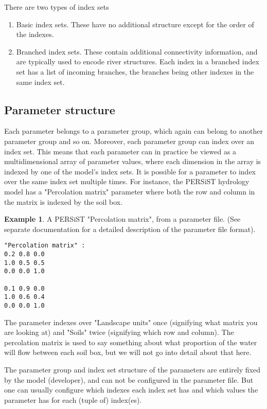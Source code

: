 \documentclass[11pt]{article}
\theoremstyle{definition}
\newtheorem{myexample}{Example}
\newenvironment{example}%
  {\begin{lrbox}{\examplebox}%
   \begin{minipage}{\dimexpr\linewidth-2\fboxsep}
   \begin{myexample}}%
  {\end{myexample}%
   \end{minipage}%
   \end{lrbox}%
   \begin{trivlist}
     \item[]\colorbox{silver}{\usebox\examplebox}
   \end{trivlist}}
\begin{document}
There are two types of index sets
\begin{enumerate}[i]
\item Basic index sets. These have no additional structure except for the order of the indexes.
\item Branched index sets. These contain additional connectivity information, and are typically used to encode river structures. Each index in a branched index set has a list of incoming branches, the branches being other indexes in the same index set.
\end{enumerate}

\subsection{Parameter structure}
Each parameter belongs to a parameter group, which again can belong to another parameter group and so on. Moreover, each parameter group can index over an index set. This means that each parameter can in practice be viewed as a multidimensional array of parameter values, where each dimension in the array is indexed by one of the model's index sets. It is possible for a parameter to index over the same index set multiple times. For instance, the PERSiST hydrology model \cite{futter14} has a "Percolation matrix" parameter where both the row and column in the matrix is indexed by the soil box.

\begin{example}
A PERSiST "Percolation matrix", from a parameter file. (See separate documentation for a detailed description of the parameter file format).
\begin{lstlisting}[style=textstyle]
"Percolation matrix" :
0.2 0.8 0.0
1.0 0.5 0.5
0.0 0.0 1.0

0.1 0.9 0.0
1.0 0.6 0.4
0.0 0.0 1.0
\end{lstlisting}
The parameter indexes over "Landscape units" once (signifying what matrix you are looking at) and "Soils" twice (signifying which row and column). The percolation matrix is used to say something about what proportion of the water will flow between each soil box, but we will not go into detail about that here.
\end{example}

The parameter group and index set structure of the parameters are entirely fixed by the model (developer), and can not be configured in the parameter file. But one can usually configure which indexes each index set has and which values the parameter has for each (tuple of) index(es). 
\end{document}
